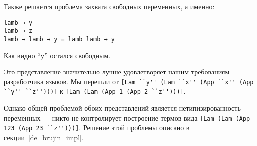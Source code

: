 Также решается проблема захвата свободных переменных, а именно:
\begin{lstlisting}
lamb → y
lamb → z
lamb → lamb → y = lamb lamb → y
\end{lstlisting}

Как видно ``y'' остался свободным.

Это представление значительно лучше удовлетворяет нашим требованиям разработчика языков. Мы перешли от
\lstinline{[Lam ``y'' (Lam ``x'' (App ``x'' (App ``y'' ``z'')))]} к \lstinline{[Lam (Lam (App 1 (App 2 ``z'')))]}.

Однако общей проблемой обоих представлений является нетипизированность переменных --- никто не контролирует построение термов вида \lstinline{[Lam (Lam (App 123 (App 23 ``z'')))]}. Решение этой проблемы описано в секции~\ref{de_brujin_impl}.
